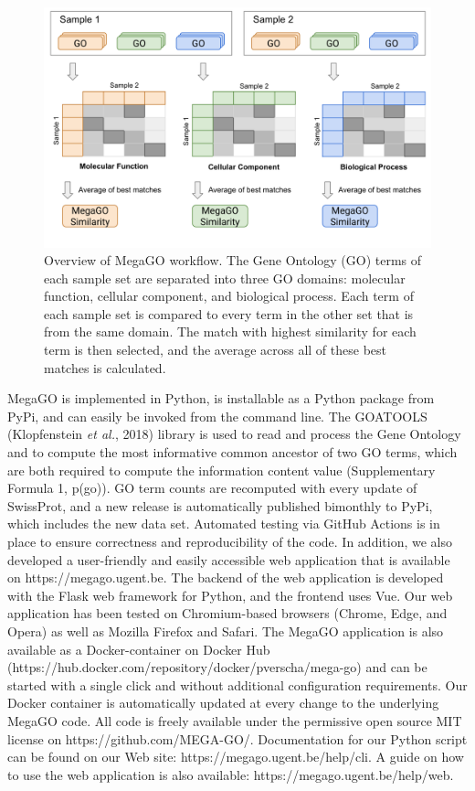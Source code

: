 \begin{figure}
\centering
\includegraphics{resources/figures/chapter4_megago_workflow_overview.png}
\caption{Overview of MegaGO workflow. The Gene Ontology (GO) terms of
each sample set are separated into three GO domains: molecular function,
cellular component, and biological process. Each term of each sample set
is compared to every term in the other set that is from the same domain.
The match with highest similarity for each term is then selected, and
the average across all of these best matches is
calculated.\label{fig:megago_workflow_overview}}
\end{figure}

MegaGO is implemented in Python, is installable as a Python package from
PyPi, and can easily be invoked from the command line. The GOATOOLS
(Klopfenstein \emph{et al.}, 2018) library is used to read and process
the Gene Ontology and to compute the most informative common ancestor of
two GO terms, which are both required to compute the information content
value (Supplementary Formula 1, p(go)). GO term counts are recomputed
with every update of SwissProt, and a new release is automatically
published bimonthly to PyPi, which includes the new data set. Automated
testing via GitHub Actions is in place to ensure correctness and
reproducibility of the code. In addition, we also developed a
user-friendly and easily accessible web application that is available on
https://megago.ugent.be. The backend of the web application is developed
with the Flask web framework for Python, and the frontend uses Vue. Our
web application has been tested on Chromium-based browsers (Chrome,
Edge, and Opera) as well as Mozilla Firefox and Safari. The MegaGO
application is also available as a Docker-container on Docker Hub
(https://hub.docker.com/repository/docker/pverscha/mega-go) and can be
started with a single click and without additional configuration
requirements. Our Docker container is automatically updated at every
change to the underlying MegaGO code. All code is freely available under
the permissive open source MIT license on https://github.com/MEGA-GO/.
Documentation for our Python script can be found on our Web site:
https://megago.ugent.be/help/cli. A guide on how to use the web
application is also available: https://megago.ugent.be/help/web.

